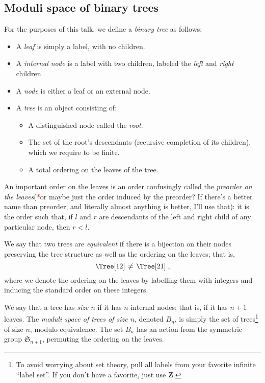 \documentclass{article}
\newcommand{\ZZ}{\mathbold{Z}}
\newcommand{\tk}{\textcolor{red}{*}}
\newcommand{\Sym}{\mathfrak{S}}
\begin{document}
\subsection{Moduli space of binary trees}
For the purposes of this talk, we define a \textit{binary tree} as follows:
\begin{itemize}
\item A \textit{leaf} is simply a label, with no children.
\item A \textit{internal node} is a label with two children, labeled the \textit{left} and \textit{right} children
\item A \textit{node} is either a leaf or an external node.
\item A \textit{tree} is an object consisting of:
  \begin{itemize}
  \item A distinguished node called the \textit{root}.
  \item The set of the root's descendants (recursive completion of its children), which we require to be finite.
  \item A total ordering on the leaves of the tree.
  \end{itemize}

\end{itemize}
An important order on the leaves is an order confusingly called the \textit{preorder on the leaves}(\tk or maybe just the order induced by the preorder?  If there's a better name than preorder, and literally almost anything is better, I'll use that): it is the order such that, if $l$ and $r$ are descendants of the left and right child of any particular node, then $r<l$.

We say that two trees are \textit{equivalent} if there is a bijection on their nodes preserving the tree structure as well as the ordering on the leaves; that is,
\[\left.\Tree[ 1 2 ] \right. \ne \left.\Tree[ 2 1 ] \right. , \]
where we denote the ordering on the leaves by labelling them with integers and inducing the standard order on these integers.

We say that a tree has \textit{size $n$} if it has $n$ internal nodes; that is, if it has $n+1$ leaves.  The \textit{moduli space of trees of size $n$}, denoted $B_n$, is simply the set of trees\footnote{To avoid worrying about set theory, pull all labels from your favorite infinite ``label set''.  If you don't have a favorite, just use $\ZZ$.} of size $n$, modulo equivalence.  The set $B_n$ has an action from the symmetric group $\Sym_{n+1}$, permuting the ordering on the leaves.
\end{document}
